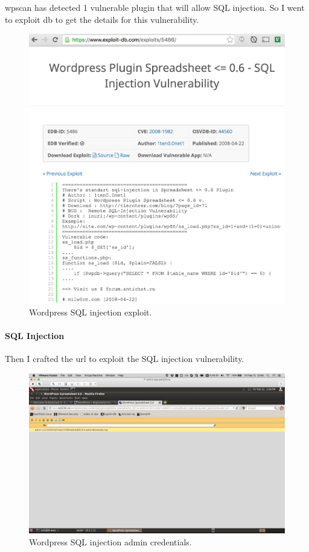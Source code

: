 \documentclass{article}
\begin{document}
\newpage
wpscan has detected 1 vulnerable plugin that will allow SQL injection. So I went
to exploit db to get the details for this vulnerability.

\begin{figure}[h!]
	\includegraphics[width=\linewidth]{images/wp-exploitdb.png}
	\caption{Wordpress SQL injection exploit.}
	\label{fig:wordpress1}
\end{figure}

\newpage
\paragraph{SQL Injection}
Then I crafted the url to exploit the SQL injection vulnerability.

\begin{figure}[h!]
	\includegraphics[width=\linewidth]{images/wp-admin-credentials.png}
	\caption{Wordpress SQL injection admin credentials.}
	\label{fig:wordpress2}
\end{figure}
\end{document}
